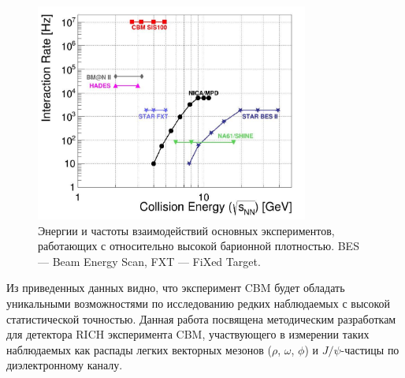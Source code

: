 

\begin{figure}[H]
\includegraphics[width=0.8\textwidth]{pictures/Experiments.png}
\caption{Энергии и частоты взаимодействий основных экспериментов, работающих с относительно высокой барионной плотностью. BES --- Beam Energy Scan, FXT --- FiXed Target.}
\label{fig:Experiments}
\end{figure}

Из приведенных данных видно, что эксперимент CBM будет обладать уникальными возможностями по исследованию редких наблюдаемых с высокой статистической точностью. Данная работа посвящена методическим разработкам для детектора RICH эксперимента CBM, участвующего в измерении таких наблюдаемых как распады легких векторных мезонов ($\rho$, $\omega$, $\phi$) и $J/\psi$-частицы по диэлектронному каналу.









